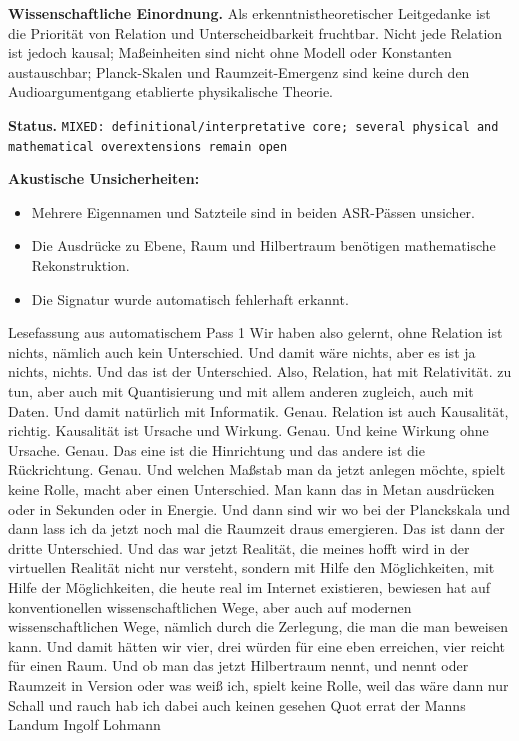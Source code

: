 \documentclass[11pt,a4paper]{article}
\newcommand{\status}[1]{\texttt{#1}}
\begin{document}
\textbf{Wissenschaftliche Einordnung.} Als erkenntnistheoretischer Leitgedanke ist die Priorität von Relation und Unterscheidbarkeit fruchtbar. Nicht jede Relation ist jedoch kausal; Maßeinheiten sind nicht ohne Modell oder Konstanten austauschbar; Planck-Skalen und Raumzeit-Emergenz sind keine durch den Audioargumentgang etablierte physikalische Theorie.

\textbf{Status.} \status{MIXED: definitional/interpretative core; several physical and mathematical overextensions remain open}

\textbf{Akustische Unsicherheiten:}
\begin{itemize}
\item Mehrere Eigennamen und Satzteile sind in beiden ASR-Pässen unsicher.
\item Die Ausdrücke zu Ebene, Raum und Hilbertraum benötigen mathematische Rekonstruktion.
\item Die Signatur wurde automatisch fehlerhaft erkannt.
\end{itemize}

\begin{asrbox}{Lesefassung aus automatischem Pass 1}
Wir haben also gelernt, ohne Relation ist nichts, nämlich auch kein Unterschied. Und damit wäre nichts, aber es ist ja nichts, nichts. Und das ist der Unterschied. Also, Relation, hat mit Relativität. zu tun, aber auch mit Quantisierung und mit allem anderen zugleich, auch mit Daten. Und damit natürlich mit Informatik. Genau. Relation ist auch Kausalität, richtig. Kausalität ist Ursache und Wirkung. Genau. Und keine Wirkung ohne Ursache. Genau. Das eine ist die Hinrichtung und das andere ist die Rückrichtung. Genau. Und welchen Maßstab man da jetzt anlegen möchte, spielt keine Rolle, macht aber einen Unterschied. Man kann das in Metan ausdrücken oder in Sekunden oder in Energie. Und dann sind wir wo bei der Planckskala und dann lass ich da jetzt noch mal die Raumzeit draus emergieren. Das ist dann der dritte Unterschied. Und das war jetzt Realität, die meines hofft wird in der virtuellen Realität nicht nur versteht, sondern mit Hilfe den Möglichkeiten, mit Hilfe der Möglichkeiten, die heute real im Internet existieren, bewiesen hat auf konventionellen wissenschaftlichen Wege, aber auch auf modernen wissenschaftlichen Wege, nämlich durch die Zerlegung, die man die man beweisen kann. Und damit hätten wir vier, drei würden für eine eben erreichen, vier reicht für einen Raum. Und ob man das jetzt Hilbertraum nennt, und nennt oder Raumzeit in Version oder was weiß ich, spielt keine Rolle, weil das wäre dann nur Schall und rauch hab ich dabei auch keinen gesehen Quot errat der Manns Landum Ingolf Lohmann
\end{asrbox}
\end{document}
